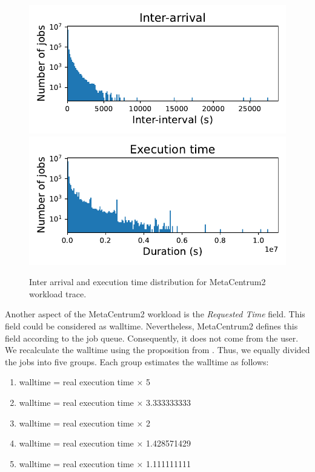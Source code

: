 \begin{figure}[!htb]
    \centering
    \includegraphics[scale=0.55]{Images/Model/interarrival.pdf}
    \includegraphics[scale=0.55]{Images/Model/execution_time.pdf}
    \caption{Inter arrival and execution time distribution for MetaCentrum2 workload trace.}
    \label{fig:metacentrum}
\end{figure}

Another aspect of the MetaCentrum2 workload is the \textit{Requested Time} field. This field could be considered as walltime. Nevertheless, MetaCentrum2 defines this field according to the job queue. Consequently, it does not come from the user. We recalculate the walltime using the proposition from \citeauthor{takizawa2020effect} \cite{takizawa2020effect}. Thus, we equally divided the jobs into five groups. Each group estimates the walltime as follows:

\begin{enumerate}
    \item walltime = real execution time $\times$ 5
    \item walltime = real execution time $\times$ 3.333333333
    \item walltime = real execution time $\times$ 2
    \item walltime = real execution time $\times$ 1.428571429
    \item walltime = real execution time $\times$ 1.111111111
\end{enumerate}

